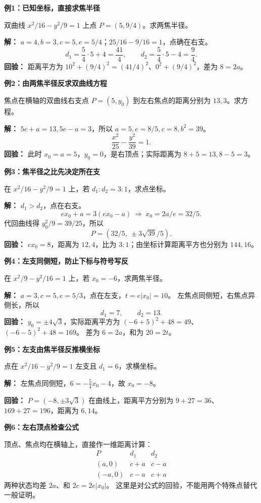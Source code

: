 \clearpage
\begin{examplebox}
\textbf{\textcolor{CExample}{例1：已知坐标，直接求焦半径}}

双曲线 $x^2/16-y^2/9=1$ 上点 $P=(5,9/4)$。求两焦半径。

\textbf{解：} $a=4,b=3,c=5,e=5/4$；$25/16-9/16=1$，点确在右支。
\[
d_1=\frac54\cdot5+4=\boxed{\frac{41}{4}},\qquad
d_2=\frac54\cdot5-4=\boxed{\frac94}.
\]
\textbf{回验：} 距离平方为 $10^2+(9/4)^2=(41/4)^2$、$0^2+(9/4)^2$，差为 $8=2a$。

\medskip
\textbf{\textcolor{CExample}{例2：由两焦半径反求双曲线方程}}

焦点在横轴的双曲线右支点 $P=(5,y_0)$ 到左右焦点的距离分别为 $13,3$。求方程。

\textbf{解：} $5e+a=13,5e-a=3$，所以 $a=5,e=8/5,c=8,b^2=39$。
\[
\boxed{\frac{x^2}{25}-\frac{y^2}{39}=1}.
\]
\textbf{回验：} 此时 $x_0=a=5$，$y_0=0$，是右顶点；实际距离为 $8+5=13,8-5=3$。

\medskip
\textbf{\textcolor{CExample}{例3：焦半径之比先决定所在支}}

在 $x^2/16-y^2/9=1$ 上，若 $d_1:d_2=3:1$，求点坐标。

\textbf{解：} $d_1>d_2$，点在右支。
\[
ex_0+a=3(ex_0-a)\ \Longrightarrow\ x_0=2a/e=32/5.
\]
代回曲线得 $y_0^2/9=39/25$，所以
\[
\boxed{P=(32/5,\ \pm3\sqrt{39}/5)}.
\]
\textbf{回验：} $ex_0=8$，距离为 $12,4$，比为 $3:1$；由坐标计算距离平方也分别为 $144,16$。
\end{examplebox}
\clearpage
\begin{examplebox}
\textbf{\textcolor{CExample}{例4：左支同侧短，防止下标与符号写反}}

在 $x^2/9-y^2/16=1$ 上，若 $x_0=-6$，求两焦半径。

\textbf{解：} $a=3,c=5,e=5/3$，点在左支，$t=e|x_0|=10$。
左焦点同侧短，右焦点异侧长，所以
\[
\boxed{d_1=7},\qquad\boxed{d_2=13}.
\]
\textbf{回验：} $y_0=\pm4\sqrt3$，实际距离平方为 $(-6+5)^2+48=49$、$(-6-5)^2+48=169$。
差为 $6=2a$，和为 $20=2t$。

\medskip
\textbf{\textcolor{CExample}{例5：左支由焦半径反推横坐标}}

点在 $x^2/16-y^2/9=1$ 左支且 $d_1=6$，求横坐标。

\textbf{解：} 左焦点同侧短，$6=-\frac54x_0-4$，故 $\boxed{x_0=-8}$。

\textbf{回验：} $P=(-8,\pm3\sqrt3)$ 在曲线上，距离平方分别为 $9+27=36$、$169+27=196$，距离为 $6,14$。

\medskip
\textbf{\textcolor{CExample}{例6：左右顶点检查公式}}

顶点、焦点均在横轴上，直接作一维距离计算：
\[
\begin{array}{c|cc}
P&d_1&d_2\\\hline
(a,0)&c+a&c-a\\
(-a,0)&c-a&c+a
\end{array}
\]
两种状态均差 $2a$、和 $2c=2e|x_0|$。
这里是对公式的回验，不能用两个特殊点替代一般证明。
\end{examplebox}
